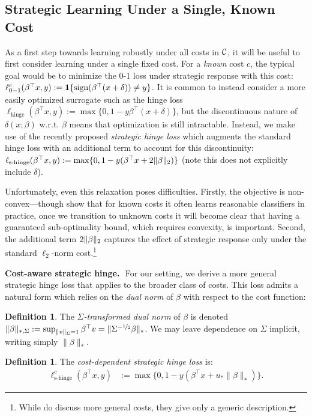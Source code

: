 \documentclass{article}
\newcommand{\costmatrix}{\Sigma}
\newcommand{\costset}{\gC}
\newcommand{\zoloss}{\ell_{0-1}}
\newcommand{\hingeloss}{\ell_{\textrm{hinge}}}
\newcommand{\shingeloss}{\ell_{\textrm{s-hinge}}}
\newcommand{\uinv}{\ensuremath{u_{*}}}
\newcommand{\dualnorm}[1]{\|#1\|_{*}}
\newcommand{\psdnorm}[2]{\matrixnorm{#1}{#2}}
\newcommand{\dualpsdnorm}[2]{\psdnorm{#1}{*,#2}}
\theoremstyle{definition}
\newtheorem{definition}[theorem]{Definition}
\renewcommand{\paragraph}[1]{{\textbf{#1}\,\,}}
\begin{document}
\subsection{Strategic Learning Under a Single, Known Cost}
As a first step towards learning robustly under all costs in $\costset$, it will be useful to first consider learning under a single fixed cost.
For a \emph{known} cost $c$, the typical goal would be to minimize the 0-1 loss under strategic response with this cost: $\zoloss^c(\beta^\top x, y) := \mathbf{1}\{\sign(\beta^\top (x+\delta)) \neq y\}$. It is common to instead consider a more easily optimized surrogate such as the hinge loss $\hingeloss(\beta^\top x, y) := \max\{0, 1-y\beta^\top (x+\delta)\}$, but the discontinuous nature of $\delta(x; \beta)$ w.r.t. $\beta$ means that optimization is still intractable. Instead, we make use of the recently proposed \emph{strategic hinge loss} \citep{levanon2022generalized} 
which augments the standard hinge loss with an additional term to account for this discontinuity:
$\shingeloss(\beta^\top x, y) := \max\{0, 1-y(\beta^\top x + 2\twonorm{\beta} )\}$ (note this does not explicitly include $\delta$).

Unfortunately, even this relaxation poses difficulties. Firstly, the objective is non-convex---though \citet{levanon2022generalized} show that for known costs it often learns reasonable classifiers in practice,
once we transition to unknown costs it will become clear that having a guaranteed sub-optimality bound, which requires convexity, is important.
Second, the additional term $2\| \beta \|_2$ captures the effect of strategic response only under the standard $\ell_2$-norm cost.\footnote{While \citet{levanon2022generalized} do discuss more general costs, they give only a generic description.}

\paragraph{Cost-aware strategic hinge.}
For our setting, we derive a more general strategic hinge loss that applies to the broader class of costs. This loss admits a natural form which relies on the \emph{dual norm} of $\beta$ with respect to the cost function:
\begin{definition}
    The \emph{$\costmatrix$-transformed dual norm} of $\beta$ is denoted $\dualpsdnorm{\beta}{\costmatrix} := \sup_{\psdnorm{v}{\costmatrix}=1} \beta^\top v = \dualnorm{\costmatrix^{-\nicefrac{1}{2}} \beta}$. We may leave dependence on $\costmatrix$ implicit, writing simply $\dualnorm{\beta}$.
\end{definition}
\begin{definition}
    The \emph{cost-dependent strategic hinge loss} is: %
    \begin{align} \label{eq:cost-dep_stratgic_hinge}
        \shingeloss^c(\beta^\top x, y) &:= \max\{0, 1 - y(\beta^\top x + \uinv \dualnorm{\beta})\}.
    \end{align}
\end{definition}
\end{document}
